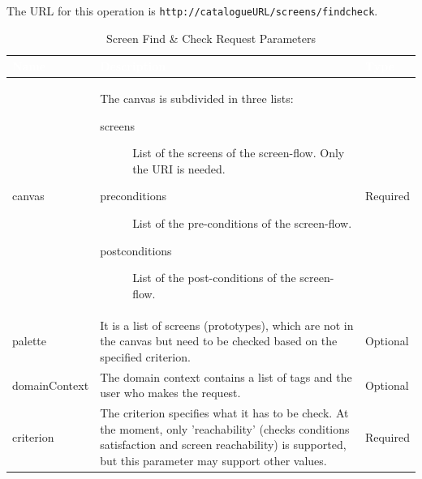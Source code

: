 \documentclass{fast_latex}
\begin{document}
The URL for this operation is \verb|http://catalogueURL/screens/findcheck|.

\begin{table}[htb!]
\caption{Screen Find \& Check Request Parameters}
\label{tab:screen_check_request}
\begin{center}
\begin{tabular}{|p{2.5cm}|p{9cm}|p{2cm}|}
\hline
\rowcolor{fast@lightgrey}\textcolor{white}{Name} &
                         \textcolor{white}{Description} &
                         \textcolor{white}{Type}\\ \hline
canvas & The canvas is subdivided in three lists:
\begin{description}
 \item[screens] List of the screens of the screen-flow. Only the URI is needed.
 \item[preconditions] List of the pre-conditions of the screen-flow.
 \item[postconditions] List of the post-conditions of the screen-flow.
 \end{description} & Required\\ \hline
palette & It is a list of screens (prototypes), which are not in the canvas but need to be checked based on the specified criterion. & Optional\\ \hline
domainContext & The domain context contains a list of tags and the user who makes the request. & Optional\\ \hline
criterion & The criterion specifies what it has to be check. At the moment, only 'reachability' (checks conditions satisfaction and screen reachability) is supported, but this parameter may support other values. & Required\\ \hline
\end{tabular}
\end{center}
\end{table}
\end{document}
